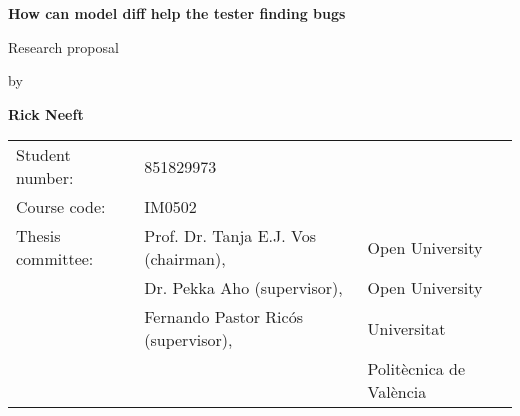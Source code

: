 \documentclass{ou-report-vaf}
\begin{document}

\pagestyle{plain}
\begin{titlepage}
\begin{center}


\vspace*{2\bigskipamount}

{\color{red}\Huge\bf How can model diff help the tester finding bugs}
\bigskip

{\large Research proposal}

\bigskip \bigskip
by
\bigskip \bigskip

{\Large\bf Rick Neeft}

\bigskip \bigskip\bigskip \bigskip

\begin{tabular}{lll}
    Student number: & 851829973 \\
    Course code: & \textsc{IM}0502\\
    Thesis committee:
        & Prof. Dr. Tanja E.J. Vos (chairman), & Open University \\
        & Dr. Pekka Aho (supervisor), & Open University \\
        & Fernando Pastor Ricós (supervisor), & Universitat \\
        &  & Politècnica de València
\end{tabular}

\end{center}
\end{titlepage}

\let\cleardoublepage\clearpage

\tableofcontents
\newpage

\printnoidxglossary[type=\acronymtype]
\newpage
\end{document}
